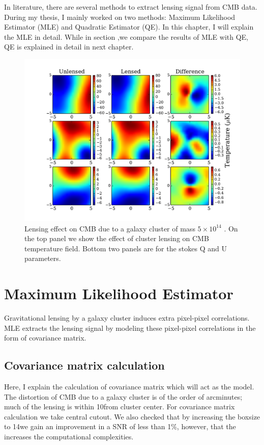 In literature, there are several methods to extract lensing signal from CMB data. 
During my thesis, I mainly worked on two methods: Maximum Likelihood Estimator (MLE) and Quadratic Estimator (QE). 
In this chapter, I will explain the MLE in detail. While in section ,we compare the results of MLE with QE, QE is explained in detail in next chapter.
\begin{figure}[t]
\begin{center}
\includegraphics[width=\linewidth, keepaspectratio]{figs/lensing_signal.pdf}
 \caption{Lensing effect on CMB due to a galaxy cluster of mass $5\times 10^{14}$ \msolar.
  On the top panel we show the effect of cluster lensing on CMB temperature field.
  Bottom two panels are for the stokes Q and U parameters. 
 } 
\label{fig:lensing_signal}
\end{center}
\end{figure}

\section{Maximum Likelihood Estimator}
\label{sec_MLE}
Gravitational lensing by a galaxy cluster induces extra pixel-pixel correlations. 
MLE extracts the lensing signal by modeling these pixel-pixel correlations in the form of covariance matrix.


\subsection{Covariance matrix calculation}
Here, I explain the calculation of covariance matrix which will act as the model.
The distortion of CMB due to a galaxy cluster is of the order of arcminutes; much of the lensing is within 10\am from cluster center.
For covariance matrix calculation we take central \smallboxsize cutout.
We also checked that by increasing the boxsize to 14\am we gain an improvement in a SNR of less than 1\%, however, that the increases the computational complexities. 


